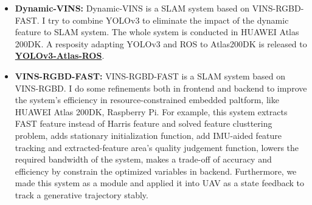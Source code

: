 \documentclass[11pt,a4paper,sans]{moderncv}        %
\begin{document}
\begin{CJK*}{UTF8}{gbsn}
{\begin{itemize}
\textbf{Jianheng Liu}, XuanFu Li, Yueqian Liu and Haoyao Chen

RA-L and IROS, 2022 (\textbf{Under review})

We develops a novel real-time system for estimating the payload position; the system consists of a monocular fisheye camera and a novel encoder-based device. A Gaussian fusion-based estimation algorithm is developed to obtain the payload state estimation. Based on the robust payload position estimation, a payload controller is presented to ensure the reliable tracking performance on aggressive trajectories. Several experiments are performed to validate the high performance of the proposed method. 

\begin{itemize}
\item \textbf{Referred Code:} \href{https://github.com/jianhengLiu/Vision-encoder-based-Payload-State-Estimator}{Code}
\item \textbf{Referred Video:} \href{https://www.bilibili.com/video/BV1Qq4y1U7n4?share_source=copy_web}{Video}
\end{itemize}
\vspace{6pt}

\item \textbf{Dynamic-VINS:} Dynamic-VINS is a SLAM system based on VINS-RGBD-FAST. I try to combine YOLOv3 to eliminate the impact of the dynamic feature to SLAM system. The whole system is conducted in HUAWEI Atlas 200DK. A resposity adapting YOLOv3 and ROS to Atlas200DK is released to \href{https://github.com/jianhengLiu/YOLOv3-Atlas-ROS}{\textbf{YOLOv3-Atlas-ROS}}.

\vspace{6pt}

\item \textbf{VINS-RGBD-FAST:} VINS-RGBD-FAST is a SLAM system based on VINS-RGBD. I do some refinements both in frontend and backend to improve the system's efficiency in resource-constrained embedded paltform, like HUAWEI Atlas 200DK, Raspberry Pi. For example, this system extracts FAST feature instead of Harris feature and solved feature clusttering problem, adds stationary initialization function, add IMU-aided feature tracking and extracted-feature area's quality judgement function, lowers the required bandwidth of the system, makes a trade-off of accuracy and efficiency by constrain the optimized variables in backend. Furthermore, we made this system as a module and applied it into UAV as a state feedback to track a generative trajectory stably. 


\end{itemize}}
\end{CJK*}
\end{document}
